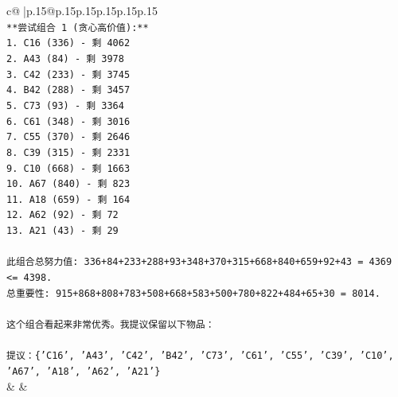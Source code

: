 \documentclass{article}
\begin{document}
{\begin{supertabular}{c@{$\;$}|p{.15\linewidth}@{}p{.15\linewidth}p{.15\linewidth}p{.15\linewidth}p{.15\linewidth}p{.15\linewidth}}
{{{\\ 
\texttt{**尝试组合 1 (贪心高价值):**} \\
\texttt{1. C16 (336) {-} 剩 4062} \\
\texttt{2. A43 (84) {-} 剩 3978} \\
\texttt{3. C42 (233) {-} 剩 3745} \\
\texttt{4. B42 (288) {-} 剩 3457} \\
\texttt{5. C73 (93) {-} 剩 3364} \\
\texttt{6. C61 (348) {-} 剩 3016} \\
\texttt{7. C55 (370) {-} 剩 2646} \\
\texttt{8. C39 (315) {-} 剩 2331} \\
\texttt{9. C10 (668) {-} 剩 1663} \\
\texttt{10. A67 (840) {-} 剩 823} \\
\texttt{11. A18 (659) {-} 剩 164} \\
\texttt{12. A62 (92) {-} 剩 72} \\
\texttt{13. A21 (43) {-} 剩 29} \\
\\ 
\texttt{此组合总努力值: 336+84+233+288+93+348+370+315+668+840+659+92+43 = 4369 <= 4398.} \\
\texttt{总重要性: 915+868+808+783+508+668+583+500+780+822+484+65+30 = 8014.} \\
\\ 
\texttt{这个组合看起来非常优秀。我提议保留以下物品：} \\
\\ 
\texttt{提议：\{'C16', 'A43', 'C42', 'B42', 'C73', 'C61', 'C55', 'C39', 'C10', 'A67', 'A18', 'A62', 'A21'\}} \\
            }
        }
    }
    & & \\ \\


\end{supertabular}}
\end{document}
